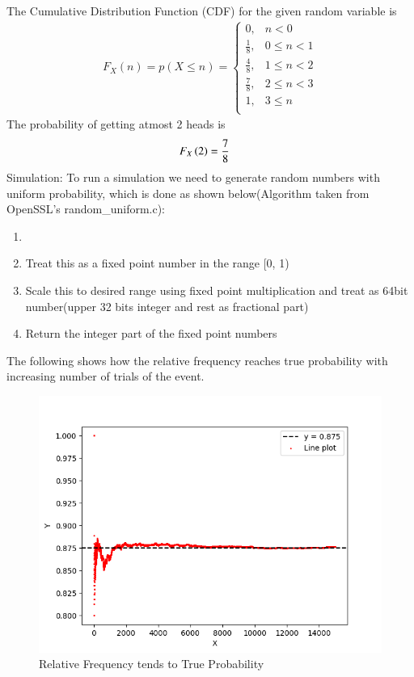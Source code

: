 \documentclass[journal]{IEEEtran}
\begin{document}
The Cumulative Distribution Function (CDF) for the given random variable is
\begin{align}
F_X(n) = p(X \le n) = 
\begin{cases}
	0, & n < 0 \\
	\frac{1}{8}, & 0 \le n < 1 \\
	\frac{4}{8}, & 1 \le n < 2 \\
	\frac{7}{8}, & 2 \le n < 3 \\
	1, & 3 \le n\\
\end{cases}
\end{align}
The probability of getting atmost 2 heads is
\begin{align}
  F_X\left(2\right) &= \frac{7}{8}
\end{align}
Simulation:
\newline
To run a simulation we need to generate random numbers with uniform probability, which is done
as shown below(Algorithm taken from OpenSSL's random\_uniform.c):
\begin{enumerate}
  \item {}
  \item Treat this as a fixed point number in the range [0, 1)
  \item Scale this to desired range using fixed point multiplication and treat as 64bit number(upper 32 bits integer and rest as fractional part)
  \item Return the integer part of the fixed point numbers
\end{enumerate}
The following shows how the relative frequency reaches true probability with increasing number of trials of the event.
\begin{figure}[h!]
   \centering
   \includegraphics[width=1\columnwidth]{figs/fig.png}
    \caption{Relative Frequency tends to True Probability}
\end{figure}
\end{document}
